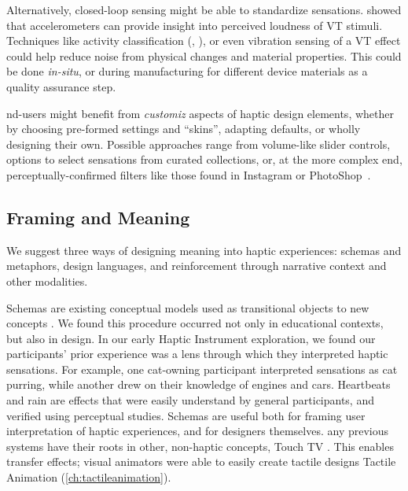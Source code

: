 Alternatively, closed-loop sensing might be able to standardize sensations.
\citet{Blum2015} showed that accelerometers can provide insight into perceived loudness of VT stimuli.
Techniques like activity classification (\eg, \cite{Schneider2013}), or even vibration sensing of a VT effect could help reduce noise from physical changes and material properties.
This could be done \emph{in-situ}, or during manufacturing for different device materials as a quality assurance step.

nd-users might benefit from \textit{customiz} aspects of haptic design elements, whether by choosing pre-formed settings and ``skins'', adapting defaults, or wholly designing their own. 
Possible approaches range from volume-like slider controls, options to select sensations from curated collections, or, at the more complex end, perceptually-confirmed filters like those found in Instagram or PhotoShop~\cite{Seifi2014,Seifi2015,SchneiderAsiaHaptics2014}.


%
%
\subsection{Framing and Meaning}
\label{ch:conclusion:framing}
We suggest three ways of designing meaning into haptic experiences:
schemas and metaphors,
design languages,
and reinforcement through narrative context and other modalities.



Schemas are existing conceptual models used as transitional objects to  new concepts \cite{Papert1980}.
We found this procedure occurred not only in educational contexts, but also in design.
In our early Haptic Instrument exploration, we found our participants' prior experience was a lens through which they interpreted haptic sensations.
For example, one cat-owning participant interpreted sensations as cat purring, while another drew on their knowledge of engines and cars.
Heartbeats and rain \cite{Israr2014} are effects that were easily understand by general participants, and verified using perceptual studies.
Schemas are useful both for framing user interpretation of haptic experiences, and for designers themselves.
any previous systems have their roots in other, non-haptic concepts, \eg Touch TV \cite{Modhrain2001}.
This enables transfer effects; visual animators were able to easily create tactile designs  Tactile Animation (\autoref{ch:tactileanimation}).

